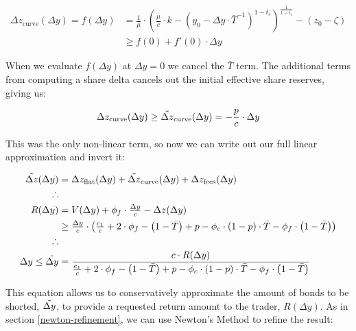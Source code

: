 \begin{equation}
\begin{aligned}
    \Delta z_{\text{curve}}(\Delta y) = f(\Delta y) &= 
    \frac{1}{\mu} \cdot \left( \frac{\mu}{c} \cdot k - \left( y_0 - \Delta y \cdot \bar{T}^{-1} \right)^{1-t_s} \right)^{\frac{1}{1 - t_s}} - (z_{0} - \zeta) \\
    &\ge f(0) + f'(0) \cdot \Delta y
\end{aligned} 
\end{equation}

When we evaluate $f(\Delta y)$ at $\Delta y = 0$ we cancel the $\bar{T}$ term.
The additional terms from computing a share delta cancels out the initial effective share reserves, giving us:

\begin{equation}\label{close-short-delta-z-curve-approx}
    \Delta z_{\text{curve}}(\Delta y) \ge \Tilde{\Delta z}_{\text{curve}}(\Delta y) = - \frac{p}{c} \cdot \Delta y
\end{equation}

This was the only non-linear term, so now we can write out our full linear approximation and invert it:

\begin{equation}\label{close-short-delta-z-approx}
\begin{aligned}
    \Tilde{\Delta z}(\Delta y) &= \Delta z_{\text{flat}}(\Delta y) + \Tilde{\Delta z}_{\text{curve}}(\Delta y) + \Delta z_{\text{fees}}(\Delta y) \\
    \therefore \\
    R(\Delta y) &=  V(\Delta y) + \phi_f \cdot \tfrac{\Delta y}{c} - \Delta z(\Delta y) \\
    &\ge \tfrac{\Delta y}{c} \cdot \left( \tfrac{c_1}{c} + 2 \cdot \phi_f - \left(1 - \bar{T} \right) + p - \phi_c \cdot (1 - p) \cdot \bar{T} - \phi_f \cdot \left( 1 - \bar{T} \right) \right) \\
    \therefore \\
    \Delta y \le \Tilde{\Delta y} &= \frac{c \cdot R(\Delta y)}{\tfrac{c_1}{c} + 2 \cdot \phi_f - \left(1 - \bar{T} \right) + p - \phi_c \cdot (1 - p) \cdot \bar{T} - \phi_f \cdot \left( 1 - \bar{T} \right)}
\end{aligned}
\end{equation}

This equation allows us to conservatively approximate the amount of bonds to be shorted, $\Tilde{\Delta y}$, to provide a requested return amount to the trader, $R(\Delta y)$.
As in section \ref{newton-refinement}, we can use Newton's Method to refine the result:


